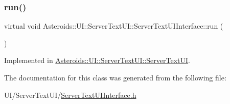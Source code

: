 \subsubsection{\texorpdfstring{run()}{run()}}
{\footnotesize\ttfamily virtual void Asteroids\+::\+U\+I\+::\+Server\+Text\+U\+I\+::\+Server\+Text\+U\+I\+Interface\+::run (\begin{DoxyParamCaption}{ }\end{DoxyParamCaption})\hspace{0.3cm}{\ttfamily [pure virtual]}}



Implemented in \hyperlink{classAsteroids_1_1UI_1_1ServerTextUI_1_1ServerTextUI_a92fb489434b5bd2a9e91f5d77c9832ac}{Asteroids\+::\+U\+I\+::\+Server\+Text\+U\+I\+::\+Server\+Text\+UI}.



The documentation for this class was generated from the following file\+:\begin{DoxyCompactItemize}
\item 
U\+I/\+Server\+Text\+U\+I/\hyperlink{ServerTextUIInterface_8h}{Server\+Text\+U\+I\+Interface.\+h}\end{DoxyCompactItemize}
